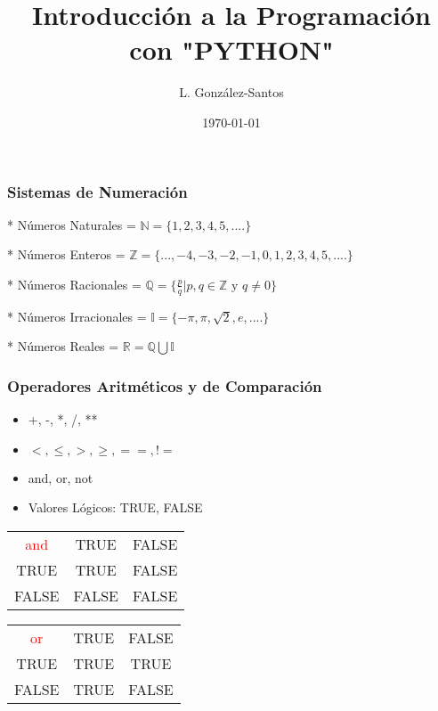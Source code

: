 \documentclass{beamer}
\title{Introducción a la Programación con "PYTHON"}
\author{L. González-Santos}
\institute{Instituto de Neurobiología, UNAM}
\date{\today}
\begin{document}
\frame{\titlepage}

\begin{frame}
\frametitle{Sistemas de Numeración}

* Números Naturales = $\mathbb{N} = \{1, 2, 3, 4, 5, .... \}$

* Números Enteros = $\mathbb{Z} = \{..., -4, -3, -2, -1, 0, 1, 2, 3, 4, 5, .... \}$

* Números Racionales = $\mathbb{Q} = \{\frac{p}{q} | p, q \in \mathbb{Z} \text{ y } q \neq 0 
\}$

* Números Irracionales = $\mathbb{I} = \{ -\pi, \pi, \sqrt{2}, e, .... \}$

* Números Reales = $\mathbb{R} = \mathbb{Q} \bigcup \mathbb{I} $

\end{frame}

\begin{frame}
\frametitle{Operadores Aritméticos y de Comparación}

\begin{itemize}
\item +, -, *, /, **
\item $ <, \leq, >, \geq, ==, != $
\item and, or, not
\item Valores Lógicos: TRUE, FALSE 
\end{itemize}

\begin{center}
\begin{tabular}{ |c|c|c| } 
 \hline
 \textcolor{red}{and} & TRUE & FALSE \\ 
 TRUE & TRUE & FALSE \\ 
 FALSE & FALSE & FALSE \\ 
 \hline
\end{tabular}
\end{center}

\hfill

\begin{center}
\begin{tabular}{ |c|c|c| }
 \hline
 \textcolor{red}{or} & TRUE & FALSE \\
 TRUE & TRUE & TRUE \\
 FALSE & TRUE & FALSE \\
 \hline
\end{tabular}

\end{center}


\end{frame}
\end{document}
